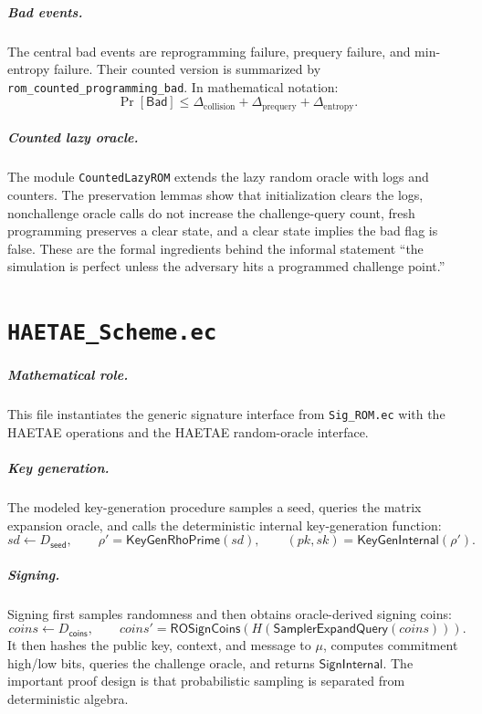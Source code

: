\documentclass[11pt]{report}
\newcommand{\file}[1]{\nolinkurl{#1}}
\newcommand{\ec}[1]{\nolinkurl{#1}}
\newcommand{\ecchapter}[2]{\chapter{\texorpdfstring{\texttt{#1}}{#2}}}
\theoremstyle{definition}
\theoremstyle{plain}
\theoremstyle{definition}
\begin{document}
\paragraph{Bad events.}
The central bad events are reprogramming failure, prequery failure, and
min-entropy failure.  Their counted version is summarized by
\ec{rom_counted_programming_bad}.  In mathematical notation:
\[
  \Pr[\mathsf{Bad}]
  \le
  \Delta_{\mathrm{collision}}
  + \Delta_{\mathrm{prequery}}
  + \Delta_{\mathrm{entropy}}.
\]

\paragraph{Counted lazy oracle.}
The module \ec{CountedLazyROM} extends the lazy random oracle with logs and
counters.  The preservation lemmas show that initialization clears the logs,
nonchallenge oracle calls do not increase the challenge-query count, fresh
programming preserves a clear state, and a clear state implies the bad flag is
false.  These are the formal ingredients behind the informal statement ``the
simulation is perfect unless the adversary hits a programmed challenge point.''



\ecchapter{HAETAE\_Scheme.ec}{HAETAE Scheme.ec}

\paragraph{Mathematical role.}
This file instantiates the generic signature interface from \file{Sig_ROM.ec}
with the HAETAE operations and the HAETAE random-oracle interface.

\paragraph{Key generation.}
The modeled key-generation procedure samples a seed, queries the matrix
expansion oracle, and calls the deterministic internal key-generation function:
\[
  sd\gets D_{\mathsf{seed}},\qquad
  \rho'=\mathsf{KeyGenRhoPrime}(sd),\qquad
  (pk,sk)=\mathsf{KeyGenInternal}(\rho').
\]

\paragraph{Signing.}
Signing first samples randomness and then obtains oracle-derived signing coins:
\[
  coins\gets D_{\mathsf{coins}},\qquad
  coins' = \mathsf{ROSignCoins}(H(\mathsf{SamplerExpandQuery}(coins))).
\]
It then hashes the public key, context, and message to \(\mu\), computes
commitment high/low bits, queries the challenge oracle, and returns
\(\mathsf{SignInternal}\).  The important proof design is that probabilistic
sampling is separated from deterministic algebra.
\end{document}
